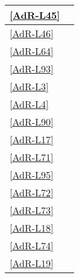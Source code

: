 \begin{longtable}{|>{\centering}m{2cm}|m{12cm}|}
	\hline \ref{AdR-L45} & \coderef{Framework::View::GUI::Image} \linebreak 
	\tabularnewline
	\hline \ref{AdR-L46} & \coderef{Framework::View::GUI::PieChart} \linebreak 
	\tabularnewline
	\hline \ref{AdR-L64} & \coderef{Framework::View::GUI::BarChart} \linebreak 
	\tabularnewline
	\hline \ref{AdR-L93} & \coderef{Framework::Model::API::LifeCycle::LifeCycle} \tabularnewline %
	\hline \ref{AdR-L3} & \coderef{ToDoList} \tabularnewline
	\hline \ref{AdR-L4} & \coderef{BubbleAndEat} \tabularnewline %
	\hline \ref{AdR-L90} & \coderef{Framework::Controller::GenericBubble} \tabularnewline
	
	\hline \ref{AdR-L17} & \coderef{ToDoList::Controller::ListItemController} \linebreak \coderef{ToDoList::Model::ItemsStore} \linebreak \coderef{ToDoList::Model::ListItem} \tabularnewline %
	\hline \ref{AdR-L71} & \coderef{Framework::View::GUI::Button} \linebreak \coderef{ToDoList::View::ListItemView} \tabularnewline %
	\hline \ref{AdR-L95} & \coderef{ToDoList::Controller::ListItemController} \tabularnewline
	\hline \ref{AdR-L72} & \coderef{Framework::View::GUI::InputText} \linebreak \coderef{ToDoList::View::ListItemView} \tabularnewline
	\hline \ref{AdR-L73} & \coderef{Framework::View::GUI::Button} \linebreak \coderef{ToDoList::View::ListItemView} \tabularnewline
	\hline \ref{AdR-L18} & \coderef{ToDoList::Controller::ListItemController} \linebreak \coderef{ToDoList::Model::ItemsStore} \linebreak \coderef{ToDoList::Model::ListItem} \tabularnewline
	\hline \ref{AdR-L74} & \coderef{ToDoList::View::ListItemView} \tabularnewline %
	\hline \ref{AdR-L19} & \coderef{ToDoList::View::ListItemView} \linebreak \coderef{ToDoList::Model::ListItem} \tabularnewline
	

\end{longtable}
